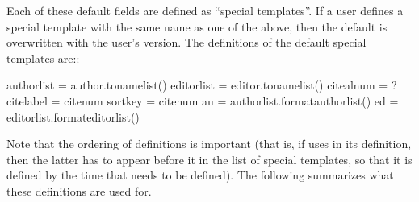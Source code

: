 \documentclass[letterpaper,10pt,english]{sphinxmanual}
\begin{document}
%
\begin{sphinxVerbatim}[commandchars=\\\{\}]
\end{sphinxVerbatim}

Each of these default fields are defined as “special templates”. If a user defines a special template with the same name as one of the above, then the default is overwritten with the user’s version. The definitions of the default special templates are::

%
\begin{sphinxVerbatim}[commandchars=\\\{\}]
authorlist = \PYGZlt{}author.to\PYGZus{}namelist()\PYGZgt{}
editorlist = \PYGZlt{}editor.to\PYGZus{}namelist()\PYGZgt{}
citealnum = ?
citelabel = \PYGZlt{}citenum\PYGZgt{}
sortkey = \PYGZlt{}citenum\PYGZgt{}
au = \PYGZlt{}authorlist.format\PYGZus{}authorlist()\PYGZgt{}
ed = \PYGZlt{}editorlist.format\PYGZus{}editorlist()\PYGZgt{}
\end{sphinxVerbatim}

Note that the ordering of definitions is important (that is, if  uses  in its definition, then the latter has to appear before it in the list of special templates, so that it is defined by the time that  needs to be defined). The following summarizes what these definitions are used for.
\end{document}
